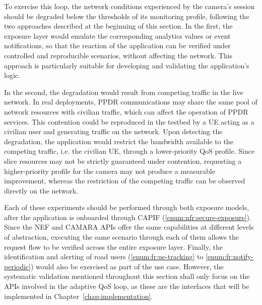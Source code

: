 To exercise this loop, the network conditions experienced by the camera's session should be degraded below the thresholds of its monitoring profile, following the two approaches described at the beginning of this section. In the first, the exposure layer would emulate the corresponding analytics values or event notifications, so that the reaction of the application can be verified under controlled and reproducible scenarios, without affecting the network. This approach is particularly suitable for developing and validating the application's logic.

In the second, the degradation would result from competing traffic in the live network. In real deployments, \acs{PPDR} communications may share the same pool of network resources with civilian traffic, which can affect the operation of \acs{PPDR} services. This contention could be reproduced in the testbed by a \acs{UE} acting as a civilian user and generating traffic on the network. Upon detecting the degradation, the application would restrict the bandwidth available to the competing traffic, i.e. the civilian \acs{UE}, through a lower-priority \acs{QoS} profile. Since slice resources may not be strictly guaranteed under contention, requesting a higher-priority profile for the camera may not produce a measurable improvement, whereas the restriction of the competing traffic can be observed directly on the network.

Each of these experiments should be performed through both exposure models, after the application is onboarded through \acs{CAPIF} (\ref{enum:nfr:secure-exposure}). Since the \acs{NEF} and CAMARA \acsp{API} offer the same capabilities at different levels of abstraction, executing the same scenario through each of them allows the request flow to be verified across the entire exposure layer. Finally, the identification and alerting of road users (\ref{enum:fr:ue-tracking} to \ref{enum:fr:notify-periodic}) would also be exercised as part of the use case. However, the systematic validation mentioned throughout this section shall only focus on the \acsp{API} involved in the adaptive \acs{QoS} loop, as these are the interfaces that will be implemented in Chapter~\ref{chap:implementation}.
